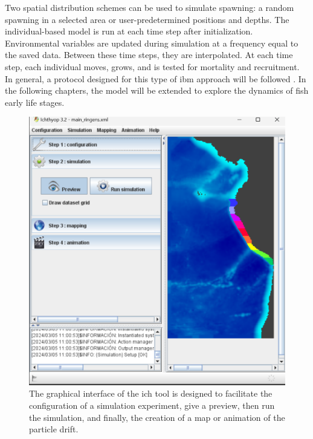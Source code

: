 Two spatial distribution schemes can be used to simulate spawning: a random spawning in a selected area or user-predetermined positions and depths. The individual-based model is run at each time step after initialization. Environmental variables are updated during simulation at a frequency equal to the saved data. Between these time steps, they are interpolated. At each time step, each individual moves, grows, and is tested for mortality and recruitment.\\

In general, a protocol designed for this type of \acrshort{ibm} approach will be followed \citep{GrimBerg2006,GrimBerg2010}. In the following chapters, the model will be extended to explore the dynamics of fish early life stages.\\

\begin{figure}[H]
	\includegraphics[width=1.0\textwidth]{figures/Chap2IchthyopGUI.png}
	\centering
	\caption{The graphical interface of the \gls{ich} tool is designed to facilitate the configuration of a simulation experiment, give a preview, then run the simulation, and finally, the creation of a map or animation of the particle drift.}
	\label{Chap2IchthyopGUI}
\end{figure}

